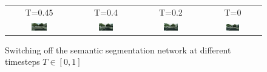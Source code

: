 \begin{figure}
\begin{tabular}{cccc}
        T=0.45 & T=0.4 & T=0.2 & T=0\\
         \includegraphics[width=0.25\textwidth]{Chapters/figures/experiments/seg_stop/0_0.44999999999999996_cond_sample.png} & \includegraphics[width=0.25\textwidth]{Chapters/figures/experiments/seg_stop/0_0.3999999999999999_cond_sample.png} & \includegraphics[width=0.25\textwidth]{Chapters/figures/experiments/seg_stop/0_0.19999999999999996_cond_sample.png}& \includegraphics[width=0.25\textwidth]{Chapters/figures/experiments/seg_stop/0_0.0_cond_sample.png} 
    \end{tabular}
    \caption[Switching off the semantic segmentation network at different timesteps]{Switching off the semantic segmentation network at different timesteps $T\in[0,1]$}
\end{figure}

